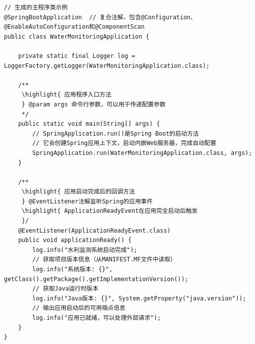 \begin{lstlisting}[style=java]
// 生成的主程序类示例
@SpringBootApplication  // 复合注解，包含@Configuration、@EnableAutoConfiguration和@ComponentScan
public class WaterMonitoringApplication {
    
    private static final Logger log = LoggerFactory.getLogger(WaterMonitoringApplication.class);
    
    /**
     \highlight{ 应用程序入口方法
     } @param args 命令行参数，可以用于传递配置参数
     */
    public static void main(String[] args) {
        // SpringApplication.run()是Spring Boot的启动方法
        // 它会创建Spring应用上下文，启动内嵌Web服务器，完成自动配置
        SpringApplication.run(WaterMonitoringApplication.class, args);
    }
    
    /**
     \highlight{ 应用启动完成后的回调方法
     } @EventListener注解监听Spring的应用事件
     \highlight{ ApplicationReadyEvent在应用完全启动后触发
     }/
    @EventListener(ApplicationReadyEvent.class)
    public void applicationReady() {
        log.info("水利监测系统启动完成");
        // 获取项目版本信息（从MANIFEST.MF文件中读取）
        log.info("系统版本: {}", getClass().getPackage().getImplementationVersion());
        // 获取Java运行时版本
        log.info("Java版本: {}", System.getProperty("java.version"));
        // 输出应用启动后的可用端点信息
        log.info("应用已就绪，可以处理外部请求");
    }
}
\end{lstlisting}


